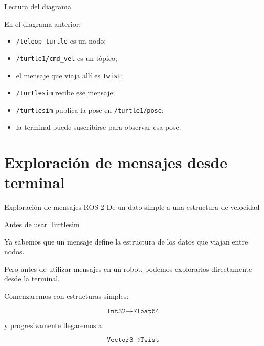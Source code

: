 \documentclass[aspectratio=169]{beamer}
\begin{document}
\begin{frame}{Lectura del diagrama}

    En el diagrama anterior:

    \begin{itemize}
        \item \texttt{/teleop\_turtle} es un nodo;
        \item \texttt{/turtle1/cmd\_vel} es un tópico;
        \item el mensaje que viaja allí es \texttt{Twist};
        \item \texttt{/turtlesim} recibe ese mensaje;
        \item \texttt{/turtlesim} publica la pose en \texttt{/turtle1/pose};
        \item la terminal puede suscribirse para observar esa pose.
    \end{itemize}

    \vspace{0.3cm}


\end{frame}

\section{Exploración de mensajes desde terminal}

\SectionSlide
{Exploración de mensajes ROS 2}
{De un dato simple a una estructura de velocidad}

\begin{frame}{Antes de usar Turtlesim}

    Ya sabemos que un mensaje define la estructura de los datos que viajan
    entre nodos.

    Pero antes de utilizar mensajes en un robot, podemos explorarlos
    directamente desde la terminal.

    \vspace{0.3cm}

    Comenzaremos con estructuras simples:

    \[
    \texttt{Int32}
    \rightarrow
    \texttt{Float64}
    \]

    y progresivamente llegaremos a:

    \[
    \texttt{Vector3}
   \rightarrow
    \boxed{\texttt{Twist}}
    \]


\end{frame}
\end{document}
